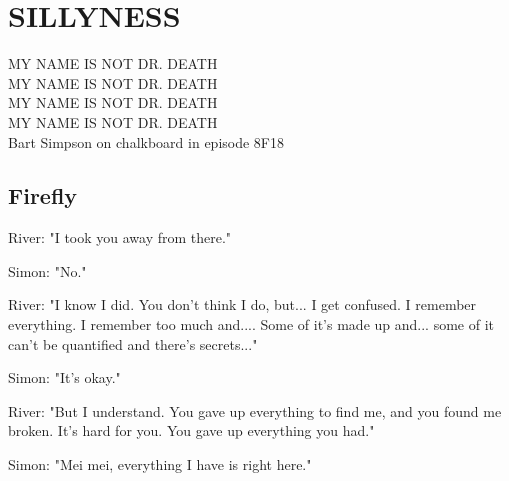 \chapter{\texorpdfstring{SILLYNESS}{}} %
\setcounter{equation}{0}  

MY NAME IS NOT DR. DEATH\\
MY NAME IS NOT DR. DEATH\\
MY NAME IS NOT DR. DEATH\\
MY NAME IS NOT DR. DEATH\\

	Bart Simpson on chalkboard in episode 8F18

\section{Firefly}
River: "I took you away from there."

Simon: "No."

River: "I know I did. You don't think I do, but... I get confused. I remember
everything. I remember too much and.... Some of it's made up and... some of
it can't be quantified and there's secrets..."

Simon: "It's okay."

River: "But I understand. You gave up everything to find me, and you found me
broken. It's hard for you. You gave up everything you had."

Simon: "Mei mei, everything I have is right here."
